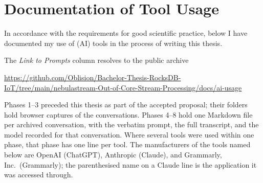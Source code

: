 \newpage
\section*{Documentation of Tool Usage}
In accordance with the requirements for good scientific practice, below I have documented my use of (AI) tools in the process of writing this thesis.

\expandafter\def\expandafter\UrlBreaks\expandafter{\UrlBreaks\do\/\do\-\do\.\do\_}

\noindent The \emph{Link to Prompts} column resolves to the public archive

\begin{center}
\small\url{https://github.com/Oblision/Bachelor-Thesis-RocksDB-IoT/tree/main/nebulastream-Out-of-Core-Stream-Processing/docs/ai-usage}
\end{center}

\noindent Phases 1--3 preceded this thesis as part of the accepted proposal; their folders hold browser captures of the conversations. Phases 4--8 hold one Markdown file per archived conversation, with the verbatim prompt, the full transcript, and the model recorded for that conversation.
Where several tools were used within one phase, that phase has one line per tool.
The manufacturers of the tools named below are OpenAI (ChatGPT), Anthropic (Claude), and Grammarly, Inc.\ (Grammarly); the parenthesised name on a Claude line is the application it was accessed through.
\vspace{0.5cm}

